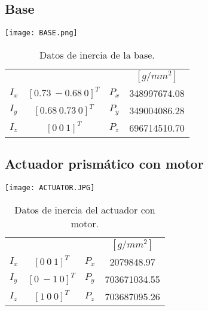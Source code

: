 \subsection{Base}
\texttt{[image: BASE.png]}
% 

\begin{table}[hb!]
 \begin{center}
\begin{tabular}{lclc}
 & & & $[g/mm^2]$\\
 $ I_x $ & $ [0.73\ -0.68\ 0]^T $ & $ P_x $ & 348997674.08\\
 $ I_y $ & $ [0.68\ 0.73\ 0]^T $ & $ P_y $ & 349004086.28\\
 $ I_z $ & $ [0 \ 0 \ 1]^T $ & $ P_z $ & 696714510.70
\end{tabular}
\end{center}
\caption{Datos de inercia de la base.}
\label{tab: inertia table base}
\end{table}

\subsection{Actuador prismático con motor}
\texttt{[image: ACTUATOR.JPG]}
\begin{table}[hb!]
 \begin{center}
\begin{tabular}{lclc}


% 


 & & & $[g/mm^2]$\\
 $ I_x $ & $ [0 \ 0 \ 1]^T $ & $ P_x $ & 2079848.97\\
 $ I_y $ & $ [0 \ -1 \ 0]^T $ & $ P_y $ & 703671034.55\\
 $ I_z $ & $ [1 \ 0 \ 0]^T $ & $ P_z $ & 703687095.26
\end{tabular}
\end{center}
\caption{Datos de inercia del actuador con motor.}
\label{tab: inertia table motor}
\end{table}

